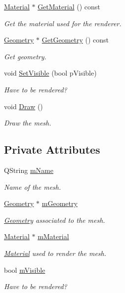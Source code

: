 \begin{DoxyCompactItemize}
\hyperlink{class_material}{Material} $\ast$ \hyperlink{class_mesh_ab4514a80fe15c07d28052c658f390435}{Get\+Material} () const 
\begin{DoxyCompactList}\small\item\em Get the material used for the renderer. \end{DoxyCompactList}\item 
\hyperlink{class_geometry}{Geometry} $\ast$ \hyperlink{class_mesh_ab33254bc85b999c9898b14ca460d6110}{Get\+Geometry} () const 
\begin{DoxyCompactList}\small\item\em Get geometry. \end{DoxyCompactList}\item 
void \hyperlink{class_mesh_ada1e356b608408e38436b364a4de5efb}{Set\+Visible} (bool p\+Visible)
\begin{DoxyCompactList}\small\item\em Have to be rendered? \end{DoxyCompactList}\item 
void \hyperlink{class_mesh_afdd95c079fd0442afef8a6c421c8bfc9}{Draw} ()
\begin{DoxyCompactList}\small\item\em Draw the mesh. \end{DoxyCompactList}\end{DoxyCompactItemize}
\subsection*{Private Attributes}
\begin{DoxyCompactItemize}
\item 
Q\+String \hyperlink{class_mesh_a2f9f4c1fafc88522f10740fccc1856d8}{m\+Name}
\begin{DoxyCompactList}\small\item\em Name of the mesh. \end{DoxyCompactList}\item 
\hyperlink{class_geometry}{Geometry} $\ast$ \hyperlink{class_mesh_a7649ad94951fbb7bdec09a5417c54ba0}{m\+Geometry}
\begin{DoxyCompactList}\small\item\em \hyperlink{class_geometry}{Geometry} associated to the mesh. \end{DoxyCompactList}\item 
\hyperlink{class_material}{Material} $\ast$ \hyperlink{class_mesh_ade1c7a3a658048aeee2efc959e2d1a5b}{m\+Material}
\begin{DoxyCompactList}\small\item\em \hyperlink{class_material}{Material} used to render the mesh. \end{DoxyCompactList}\item 
bool \hyperlink{class_mesh_a44b5e53f131fa3af673534cb45b6cf6e}{m\+Visible}
\begin{DoxyCompactList}\small\item\em Have to be rendered? \end{DoxyCompactList}\end{DoxyCompactItemize}


